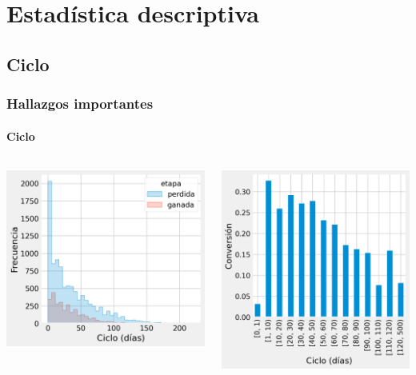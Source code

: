 \documentclass[aspectratio=149]{beamer}
\begin{document}
\section{Estadística descriptiva}
\subsection{Ciclo}
\begin{frame}
	\frametitle{Hallazgos importantes}
	\framesubtitle{Ciclo}
	\begin{columns}
		\begin{column}{0.55\textwidth}
			\centering
			\includegraphics[width=\textwidth]{ciclo-histograma.png} \\
		\end{column}
		\begin{column}{0.46\textwidth}
			\centering
			\includegraphics[width=\textwidth]{conversion-ciclo.png} \\

\end{column}
\end{columns}
\end{frame}
\end{document}
